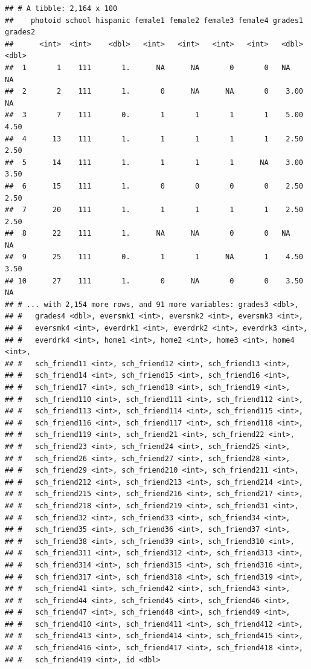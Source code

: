 \documentclass[]{book}
\theoremstyle{definition}
\theoremstyle{definition}
\theoremstyle{definition}
\theoremstyle{remark}
\begin{document}
\begin{verbatim}
## # A tibble: 2,164 x 100
##    photoid school hispanic female1 female2 female3 female4 grades1 grades2
##      <int>  <int>    <dbl>   <int>   <int>   <int>   <int>   <dbl>   <dbl>
##  1       1    111       1.      NA      NA       0       0   NA      NA   
##  2       2    111       1.       0      NA      NA       0    3.00   NA   
##  3       7    111       0.       1       1       1       1    5.00    4.50
##  4      13    111       1.       1       1       1       1    2.50    2.50
##  5      14    111       1.       1       1       1      NA    3.00    3.50
##  6      15    111       1.       0       0       0       0    2.50    2.50
##  7      20    111       1.       1       1       1       1    2.50    2.50
##  8      22    111       1.      NA      NA       0       0   NA      NA   
##  9      25    111       0.       1       1      NA       1    4.50    3.50
## 10      27    111       1.       0      NA       0       0    3.50   NA   
## # ... with 2,154 more rows, and 91 more variables: grades3 <dbl>,
## #   grades4 <dbl>, eversmk1 <int>, eversmk2 <int>, eversmk3 <int>,
## #   eversmk4 <int>, everdrk1 <int>, everdrk2 <int>, everdrk3 <int>,
## #   everdrk4 <int>, home1 <int>, home2 <int>, home3 <int>, home4 <int>,
## #   sch_friend11 <int>, sch_friend12 <int>, sch_friend13 <int>,
## #   sch_friend14 <int>, sch_friend15 <int>, sch_friend16 <int>,
## #   sch_friend17 <int>, sch_friend18 <int>, sch_friend19 <int>,
## #   sch_friend110 <int>, sch_friend111 <int>, sch_friend112 <int>,
## #   sch_friend113 <int>, sch_friend114 <int>, sch_friend115 <int>,
## #   sch_friend116 <int>, sch_friend117 <int>, sch_friend118 <int>,
## #   sch_friend119 <int>, sch_friend21 <int>, sch_friend22 <int>,
## #   sch_friend23 <int>, sch_friend24 <int>, sch_friend25 <int>,
## #   sch_friend26 <int>, sch_friend27 <int>, sch_friend28 <int>,
## #   sch_friend29 <int>, sch_friend210 <int>, sch_friend211 <int>,
## #   sch_friend212 <int>, sch_friend213 <int>, sch_friend214 <int>,
## #   sch_friend215 <int>, sch_friend216 <int>, sch_friend217 <int>,
## #   sch_friend218 <int>, sch_friend219 <int>, sch_friend31 <int>,
## #   sch_friend32 <int>, sch_friend33 <int>, sch_friend34 <int>,
## #   sch_friend35 <int>, sch_friend36 <int>, sch_friend37 <int>,
## #   sch_friend38 <int>, sch_friend39 <int>, sch_friend310 <int>,
## #   sch_friend311 <int>, sch_friend312 <int>, sch_friend313 <int>,
## #   sch_friend314 <int>, sch_friend315 <int>, sch_friend316 <int>,
## #   sch_friend317 <int>, sch_friend318 <int>, sch_friend319 <int>,
## #   sch_friend41 <int>, sch_friend42 <int>, sch_friend43 <int>,
## #   sch_friend44 <int>, sch_friend45 <int>, sch_friend46 <int>,
## #   sch_friend47 <int>, sch_friend48 <int>, sch_friend49 <int>,
## #   sch_friend410 <int>, sch_friend411 <int>, sch_friend412 <int>,
## #   sch_friend413 <int>, sch_friend414 <int>, sch_friend415 <int>,
## #   sch_friend416 <int>, sch_friend417 <int>, sch_friend418 <int>,
## #   sch_friend419 <int>, id <dbl>
\end{verbatim}
\end{document}
